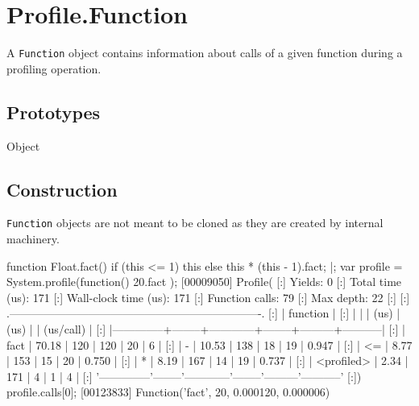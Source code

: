 
\section{Profile.Function}

A \lstinline|Function| object contains information about calls of a
given function during a profiling operation.

\subsection{Prototypes}

\begin{refObjects}
\item[Object]
\end{refObjects}

\subsection{Construction}

\lstinline|Function| objects are not meant to be cloned as they are
created by  internal machinery.

\begin{urbiscript}
function Float.fact()
{
  if (this <= 1)
    this
  else
    this * (this - 1).fact;
}|;
var profile = System.profile(function() { 20.fact });
[00009050] Profile(
[:]  Yields:                    0
[:]  Total time (us):         171
[:]  Wall-clock time (us):    171
[:]  Function calls:           79
[:]  Max depth:                22
[:]
[:]  .-------------------------------------------------------------------.
[:]  |   function   |   %
[:]  |              |        |    (us)    |  (us)  |         | (us/call) |
[:]  |--------------+--------+------------+--------+---------+-----------|
[:]  |         fact |  70.18 |        120 |    120 |      20 |         6 |
[:]  |            - |  10.53 |        138 |     18 |      19 |     0.947 |
[:]  |           <= |   8.77 |        153 |     15 |      20 |     0.750 |
[:]  |            * |   8.19 |        167 |     14 |      19 |     0.737 |
[:]  |   <profiled> |   2.34 |        171 |      4 |       1 |         4 |
[:]  '--------------'--------'------------'--------'---------'-----------'
[:])
profile.calls[0];
[00123833] Function('fact', 20, 0.000120, 0.000006)
\end{urbiscript}

